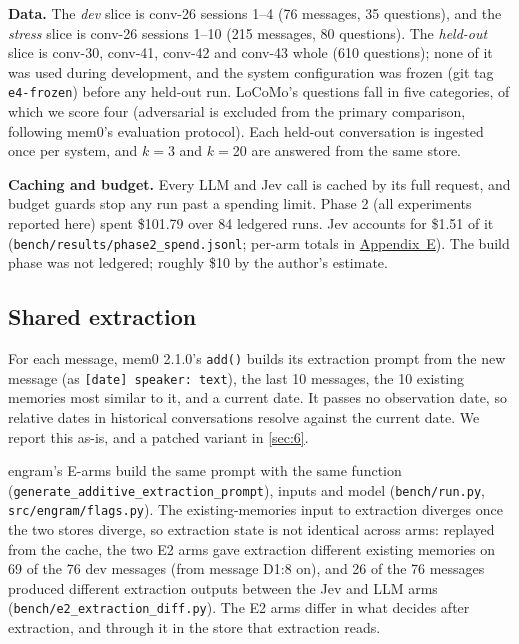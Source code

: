 \documentclass[11pt]{article}
\newcommand{\src}[1]{}
\begin{document}
\textbf{Data.} The \emph{dev} slice is conv-26 sessions 1--4 (76\src{bench/results/e2\_jev\_\_dev.json} messages, 35\src{bench/results/e2\_jev\_\_dev.json} questions), and the \emph{stress} slice is conv-26 sessions 1--10 (215\src{bench/results/e2\_jev\_\_stress.json} messages, 80\src{bench/results/e2\_jev\_\_stress.json} questions). The \emph{held-out} slice is conv-30, conv-41, conv-42 and conv-43 whole (610\src{bench/results/heldout\_report.json} questions); none of it was used during development, and the system configuration was frozen (git tag \texttt{e4-frozen}) before any held-out run. LoCoMo's questions fall in five categories, of which we score four (adversarial is excluded from the primary comparison, following mem0's evaluation protocol). Each held-out conversation is ingested once per system, and $k{=}$3 and $k{=}$20 are answered from the same store.

\textbf{Caching and budget.} Every LLM and Jev call is cached by its full request, and budget guards stop any run past a spending limit. Phase 2 (all experiments reported here) spent \$101.79\src{bench/results/phase2\_spend.jsonl} over 84\src{bench/results/phase2\_spend.jsonl} ledgered runs. Jev accounts for \$1.51\src{bench/results/phase2\_spend.jsonl} of it (\texttt{bench/\allowbreak{}results/\allowbreak{}phase2\_\allowbreak{}spend.jsonl}; per-arm totals in \hyperref[app:E]{Appendix~E}). The build phase was not ledgered; roughly \$10 by the author's estimate.

\subsection{Shared extraction}\label{sec:4.2}
For each message, mem0 2.1.0's \texttt{add()} builds its extraction prompt from the new message (as \texttt{[date] speaker: text}), the last 10\src{src/engram/flags.py (extract\_last\_k, as mem0 2.1.0)} messages, the 10\src{src/engram/config.py} existing memories most similar to it, and a current date. It passes no observation date, so relative dates in historical conversations resolve against the current date. We report this as-is, and a patched variant in \cref{sec:6}.

engram's E-arms build the same prompt with the same function (\texttt{generate\_\allowbreak{}additive\_\allowbreak{}extraction\_\allowbreak{}prompt}), inputs and model (\texttt{bench/\allowbreak{}run.py}, \texttt{src/\allowbreak{}engram/\allowbreak{}flags.py}). The existing-memories input to extraction diverges once the two stores diverge, so extraction state is not identical across arms: replayed from the cache, the two E2 arms gave extraction different existing memories on 69\src{bench/results/e2\_extraction\_diff.json} of the 76\src{bench/results/e2\_extraction\_diff.json} dev messages (from message D1:8 on), and 26\src{bench/results/e2\_extraction\_diff.json} of the 76\src{bench/results/e2\_extraction\_diff.json} messages produced different extraction outputs between the Jev and LLM arms (\texttt{bench/\allowbreak{}e2\_\allowbreak{}extraction\_\allowbreak{}diff.py}). The E2 arms differ in what decides after extraction, and through it in the store that extraction reads.
\end{document}
